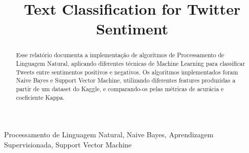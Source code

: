 \documentclass[conference]{IEEEtran}
\begin{document}
\title{Text Classification for Twitter Sentiment\\
}

\author{
\and
{}
\and
{}
}

\maketitle


\begin{abstract}
Esse relatório documenta a implementação de algoritmos de Processamento de Linguagem Natural, aplicando diferentes técnicas de Machine Learning para classificar Tweets entre sentimentos positivos e negativos. Os algoritmos implementados foram Naive Bayes e Support Vector Machine, utilizando diferentes features produzidas a partir de um dataset do Kaggle, e comparando-os pelas métricas de acurácia e coeficiente Kappa.
\end{abstract}

\begin{IEEEkeywords}
Processamento de Linguagem Natural, Naive Bayes, Aprendizagem Supervisionada, Support Vector Machine
\end{IEEEkeywords}
\end{document}
